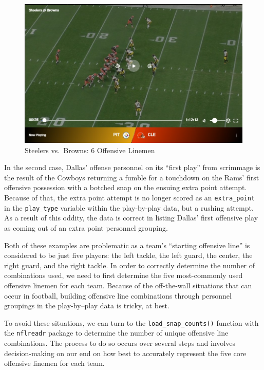 \documentclass[
  letterpaper,
]{krantz}
\begin{document}
\begin{figure}

{\centering \includegraphics{images/all-22-screenshot.jpg}

}

\caption{Steelers vs.~Browns: 6 Offensive Linemen}

\end{figure}

In the second case, Dallas' offense personnel on its ``first play'' from
scrimmage is the result of the Cowboys returning a fumble for a
touchdown on the Rams' first offensive possession with a botched snap on
the ensuing extra point attempt. Because of that, the extra point
attempt is no longer scored as an \texttt{extra\_point} in the
\texttt{play\_type} variable within the play-by-play data, but a rushing
attempt. As a result of this oddity, the data is correct in listing
Dallas' first offensive play as coming out of an extra point personnel
grouping.

Both of these examples are problematic as a team's ``starting offensive
line'' is considered to be just five players: the left tackle, the left
guard, the center, the right guard, and the right tackle. In order to
correctly determine the number of combinations used, we need to first
determine the five most-commonly used offensive linemen for each team.
Because of the off-the-wall situations that can occur in football,
building offensive line combinations through personnel groupings in the
play-by--play data is tricky, at best.

To avoid these situations, we can turn to the
\texttt{load\_snap\_counts()} function with the \texttt{nflreadr}
package to determine the number of unique offensive line combinations.
The process to do so occurs over several steps and involves
decision-making on our end on how best to accurately represent the five
core offensive linemen for each team.
\end{document}
